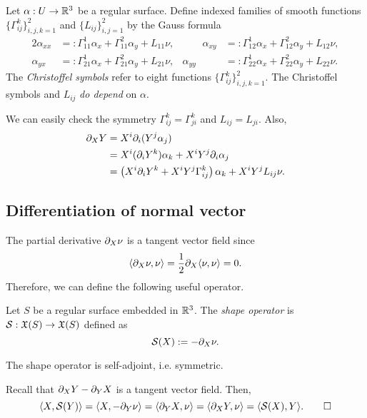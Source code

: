 \documentclass{../../large}
\begin{document}
\begin{defn}
Let $\alpha:U\to\mathbb{R}^3$ be a regular surface.
Define indexed families of smooth functions $\{\Gamma_{ij}^k\}_{i,j,k=1}^2$ and $\{L_{ij}\}_{i,j=1}^2$ by the Gauss formula
\begin{alignat*}{2}
\alpha_{xx}&=:\Gamma_{11}^1\alpha_x+\Gamma_{11}^2\alpha_y+L_{11}\nu,&\qquad
\alpha_{xy}&=:\Gamma_{12}^1\alpha_x+\Gamma_{12}^2\alpha_y+L_{12}\nu,\\
\alpha_{yx}&=:\Gamma_{21}^1\alpha_x+\Gamma_{21}^2\alpha_y+L_{21}\nu,&
\alpha_{yy}&=:\Gamma_{22}^1\alpha_x+\Gamma_{22}^2\alpha_y+L_{22}\nu.
\end{alignat*}
The \emph{Christoffel symbols} refer to eight functions $\{\Gamma_{ij}^k\}_{i,j,k=1}^2$.
The Christoffel symbols and $L_{ij}$ \emph{do depend} on $\alpha$.
\end{defn}
We can easily check the symmetry $\Gamma_{ij}^k=\Gamma_{ji}^k$ and $L_{ij}=L_{ji}$.
Also,
\begin{align*}
\pd_XY
&=X^i\pd_i(Y^j\alpha_j)\\
&=X^i(\pd_iY^k)\alpha_k+X^iY^j\pd_i\alpha_j\\
&=\left(X^i\pd_iY^k+X^iY^j\Gamma_{ij}^k\right)\alpha_k+X^iY^jL_{ij}\nu.
\end{align*}



\subsection*{Differentiation of normal vector}

The partial derivative $\pd_X\nu$ is a tangent vector field since
\[\<\pd_X\nu,\nu\>=\frac12\pd_X\<\nu,\nu\>=0.\]
Therefore, we can define the following useful operator.
\begin{defn}
Let $S$ be a regular surface embedded in $\mathbb{R}^3$.
The \emph{shape operator} is $\mathcal{S}:\mathfrak{X}(S)\to\mathfrak{X}(S)$ defined as
\[\cS(X):=-\pd_X\nu.\]
\end{defn}
\begin{prop}
The shape operator is self-adjoint, i.e. symmetric.
\end{prop}
\begin{pf}
Recall that $\pd_XY-\pd_YX$ is a tangent vector field.
Then,
\[\<X,\cS(Y)\>=\<X,-\pd_Y\nu\>=\<\pd_YX,\nu\>=\<\pd_XY,\nu\>=\<\cS(X),Y\>.\qedhere\]
\end{pf}

\end{document}
